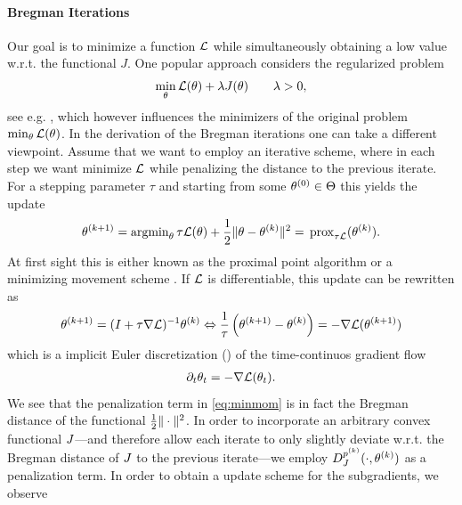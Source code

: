 \paragraph{Bregman Iterations} Our goal is to minimize a function $\mathcal{L}$ while simultaneously obtaining a low value w.r.t. the functional $J$. One popular approach considers the regularized problem
%
\begin{align*}
\min_\theta \mathcal{L}(\theta) + \lambda J(\theta)\qquad \lambda>0,
\end{align*}
%
see e.g. \cite{tikhonov1943stability, combettes2008proximal,daubechies2004iterative,fadili2006sparse,figueiredo2007gradient,chambolle2004algorithm,chambolle2011first}, which however influences the minimizers of the original problem $\min_\theta \mathcal{L}(\theta)$. In the derivation of the Bregman iterations one can take a different viewpoint. Assume that we want to employ an iterative scheme, where in each step we want minimize $\mathcal{L}$ while penalizing the distance to the previous iterate. For a stepping parameter $\tau$ and starting from some $\theta^{(0)}\in\Theta$ this yields the update
%
\begin{align}\label{eq:minmom}
\theta^{(k+1)} = \operatorname{argmin}_\theta \tau\mathcal{L}(\theta) + \frac{1}{2}\|\theta -\theta^{(k)}\|^2 
= \,\mathrm{prox}_{\tau\mathcal{L}}(\theta^{(k)}).
\end{align}
%
At first sight this is either known as the proximal point algorithm \cite{bregman1967relaxation} or a minimizing movement scheme \cite{de1993new}. If $\mathcal{L}$ is differentiable, this update can be rewritten as 
%
\begin{align*}
\param^\k{k+1} = (I+\tau\nabla\empLoss)^{-1}\param^\k{k}
%
\Leftrightarrow
%
\frac{1}{\tau}\left(\param^\k{k+1} - \param^\k{k}\right)
= -\nabla\empLoss(\param^\k{k+1})
\end{align*}
%
which is a implicit Euler discretization (\cite{euler1824institutionum}) of the time-continuos gradient flow
%
\begin{align*}
\partial_t \theta_t = -\nabla\mathcal{L}(\theta_t).
\end{align*}
%
%
We see that the penalization term in \cref{eq:minmom} is in fact the Bregman distance of the functional $\frac{1}{2}\|\cdot\|^2$. In order to incorporate an arbitrary convex functional $J$---and therefore allow each iterate to only slightly deviate w.r.t. the Bregman distance of $J$ to the previous iterate---we employ $D_J^{p^{(k)}}(\cdot, \theta^{(k)})$ as a penalization term. In order to obtain a update scheme for the subgradients, we observe
